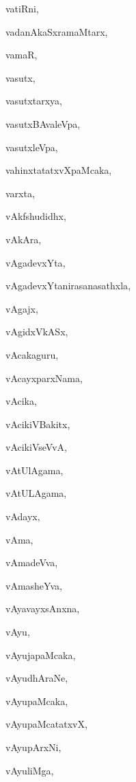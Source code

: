 \begin{multicols}{2}
{vatiRni}, \pageref{vatiRni}

{vadanAkaSxramaMtarx}, \pageref{vadanAkaSxramaMtarx}

{vamaR}, \pageref{vamaR}

{vasutx}, \pageref{vasutx}

{vasutxtarxya}, \pageref{vasutxtarxya}

{vasutxBAvaleVpa}, \pageref{vasutxBAvaleVpa}

{vasutxleVpa}, \pageref{vasutxleVpa}

{vahinxtatatxvXpaMcaka}, \pageref{vahinxtatatxvXpaMcaka}

{varxta}, \pageref{varxta}

{vAkfshudidhx}, \pageref{vAkfshudidhx}

{vAkAra}, \pageref{vAkAra}

{vAgadevxYta}, \pageref{vAgadevxYta}

{vAgadevxYtanirasanasathxla}, \pageref{vAgadevxYtanirasanasathxla}

{vAgajx}, \pageref{vAgajx}

{vAgidxVkASx}, \pageref{vAgidxVkASx}

{vAcakaguru}, \pageref{vAcakaguru}

{vAcayxparxNama}, \pageref{vAcayxparxNama}

{vAcika}, \pageref{vAcika}

{vAcikiVBakitx}, \pageref{vAcikiVBakitx}

{vAcikiVseVvA}, \pageref{vAcikiVseVvA}

{vAtUlAgama}, \pageref{vAtUlAgama}

{vAtULAgama}, \pageref{vAtULAgama}

{vAdayx}, \pageref{vAdayx}

{vAma}, \pageref{vAma}

{vAmadeVva}, \pageref{vAmadeVva}

{vAmasheYva}, \pageref{vAmasheYva}

{vAyavayxsAnxna}, \pageref{vAyavayxsAnxna}

{vAyu}, \pageref{vAyu}

{vAyujapaMcaka}, \pageref{vAyujapaMcaka}

{vAyudhAraNe}, \pageref{vAyudhAraNe}

{vAyupaMcaka}, \pageref{vAyupaMcaka}

{vAyupaMcatatxvX}, \pageref{vAyupaMcatatxvX}

{vAyupArxNi}, \pageref{vAyupArxNi}

{vAyuliMga}, \pageref{vAyuliMga}


\end{multicols}
